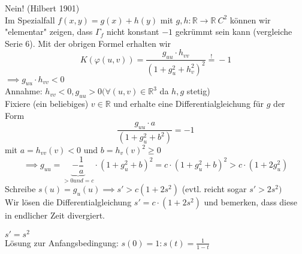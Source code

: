 \documentclass[../main.tex]{subfiles}
\begin{document}
\begin{answer}
    Nein! (Hilbert 1901)\\
    Im Spezialfall $f(x,y)=g(x)+h(y)$ mit $g,h:\mathbb{R}\to\mathbb{R} \ C^{2}$ können wir "elementar" zeigen, dass $\Gamma_{f}$ nicht konstant $-1$ gekrümmt sein kann (vergleiche Serie 6). 
    Mit der obrigen Formel erhalten wir $$K(\varphi(u,v)) = \frac{g_{uu}\cdot h_{vv}}{(1+g_{u}^{2}+h_{v}^{2})^{2}} \stackrel{!}{=} -1$$
    $\implies g_{uu} \cdot h_{vv} < 0$\\
    Annahme: $h_{vv} <0, g_{uu}> 0 (\forall(u,v)\in\mathbb{R}^{3}$ da $h,g$ stetig)\\
    Fixiere (ein beliebiges) $v \in\mathbb{R}$ und erhalte eine Differentialgleichung für $g$ der Form 
    $$ \frac{g_{uu}\cdot a}{(1+g_{u}^{2}+b^{2})} = -1 $$ mit $a = h_{vv}(v) < 0$ und $b=h_{v}(v)^{2}\geq 0$
    $$\implies g_{uu} = \underbrace{-\frac{1}{a}}_{>0 und =c} \cdot (1+g_{u}^{2}+b)^{2} = c\cdot (1+g_{u}^{2}+b)^{2} > c\cdot (1 + 2g_{u}^{2})$$
    Schreibe $s(u) = g_{u}(u) \implies s'>c(1+2s^{2})$ (evtl. reicht sogar $s'>2s^{2})$\\
    Wir lösen die Differentialgleichung $s' = c\cdot (1 + 2s^{2})$ und bemerken, dass diese in endlicher Zeit divergiert. 
\end{answer}
\begin{example}
    $s'=s^{2}$\\
    Lösung zur Anfangsbedingung: $s(0) = 1: s(t)=\frac{1}{1-t}$
\end{example}
\end{document}
